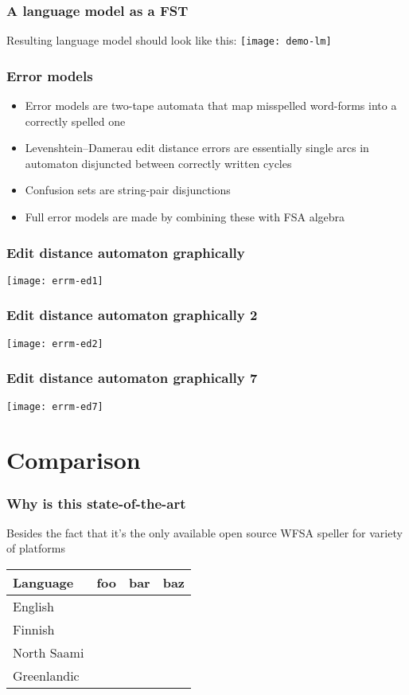 \documentclass[t,12pt]{beamer}
\begin{document}
\begin{frame}
    \frametitle{A language model as a FST}
    Resulting language model should look like this:
    \texttt{[image: demo-lm]}
\end{frame}

\begin{frame}
   \frametitle{Error models}
   \begin{itemize}
       \item Error models are two-tape automata that map misspelled word-forms
           into a correctly spelled one
       \item Levenshtein--Damerau edit distance errors are essentially single
           arcs in automaton disjuncted between correctly written cycles
       \item Confusion sets are string-pair disjunctions
       \item Full error models are made by combining these with FSA algebra
   \end{itemize}
\end{frame}

\begin{frame}
    \frametitle{Edit distance automaton graphically}
    \texttt{[image: errm-ed1]}
\end{frame}

\begin{frame}
    \frametitle{Edit distance automaton graphically 2}
    \texttt{[image: errm-ed2]}
\end{frame}

\begin{frame}
    \frametitle{Edit distance automaton graphically 7}
    \texttt{[image: errm-ed7]}
\end{frame}

\section{Comparison}

\begin{frame}
    \frametitle{Why is this state-of-the-art}
    {\tiny Besides the fact that it's the only available open source WFSA speller
        for variety of platforms\hyperlink{links}{}}\\
        \begin{table}
            \begin{tabular}{l|rrr}
                \textbf{Language} & foo & bar & baz \\
                \hline
                English & & & \\
                Finnish & & & \\
                North Saami & & & \\
                Greenlandic & & & \\
            \end{tabular}
        \end{table}
\end{frame}
\end{document}
